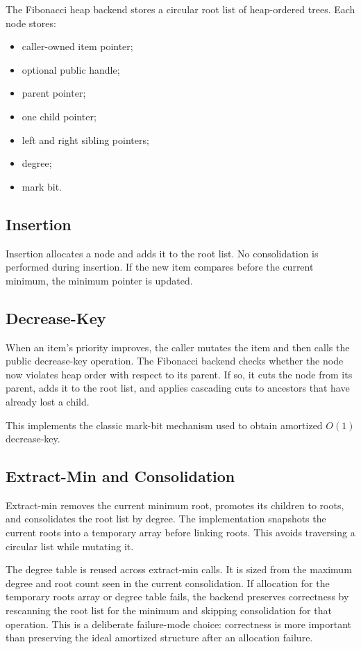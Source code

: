 The Fibonacci heap backend stores a circular root list of heap-ordered trees.
Each node stores:

\begin{itemize}
    \item caller-owned item pointer;
    \item optional public handle;
    \item parent pointer;
    \item one child pointer;
    \item left and right sibling pointers;
    \item degree;
    \item mark bit.
\end{itemize}

\subsection{Insertion}

Insertion allocates a node and adds it to the root list.
No consolidation is performed during insertion.
If the new item compares before the current minimum, the minimum pointer is updated.

\subsection{Decrease-Key}

When an item's priority improves, the caller mutates the item and then calls the public decrease-key operation.
The Fibonacci backend checks whether the node now violates heap order with respect to its parent.
If so, it cuts the node from its parent, adds it to the root list, and applies cascading cuts to ancestors that have already lost a child.

This implements the classic mark-bit mechanism used to obtain amortized $O(1)$ decrease-key.

\subsection{Extract-Min and Consolidation}

Extract-min removes the current minimum root, promotes its children to roots, and consolidates the root list by degree.
The implementation snapshots the current roots into a temporary array before linking roots.
This avoids traversing a circular list while mutating it.

The degree table is reused across extract-min calls.
It is sized from the maximum degree and root count seen in the current consolidation.
If allocation for the temporary roots array or degree table fails, the backend preserves correctness by rescanning the root list for the minimum and skipping consolidation for that operation.
This is a deliberate failure-mode choice: correctness is more important than preserving the ideal amortized structure after an allocation failure.

